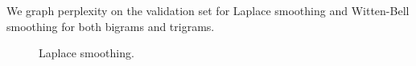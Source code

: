 \documentclass[11pt]{article}
\begin{document}
We graph perplexity on the validation set for Laplace smoothing and Witten-Bell smoothing for both bigrams and trigrams. 

\begin{figure}
\centering
{}
\hfill
{}
\caption{Laplace smoothing.}
\end{figure}
\end{document}
